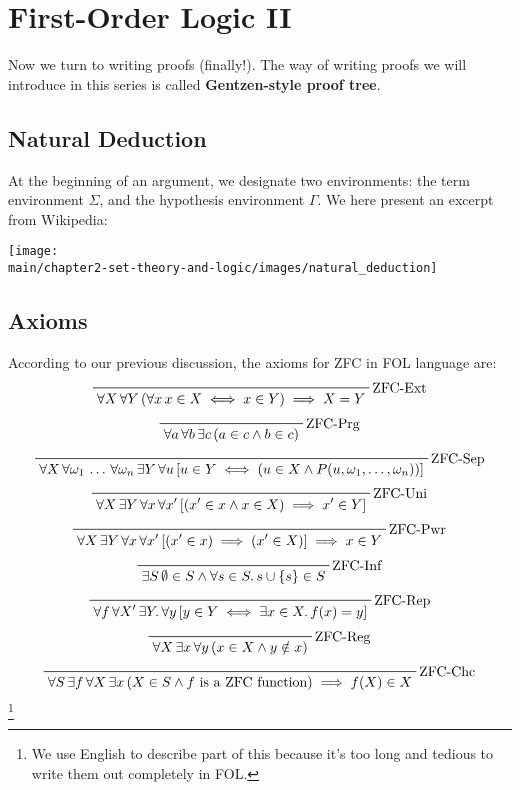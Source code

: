 \documentclass[../main.tex]{subfiles}
\begin{document}
\section{First-Order Logic II}
Now we turn to writing proofs (finally!). The way of writing proofs we will introduce in this series is called \textbf{Gentzen-style proof tree}.


\subsection{Natural Deduction}\label{sub:natural_deduction}
At the beginning of an argument, we designate two environments: the term environment $\Sigma$, and the hypothesis environment $\Gamma$. We here present an excerpt from Wikipedia:
\begin{center}
\texttt{[image: \\main/chapter2-set-theory-and-logic/images/natural\_deduction]}
\end{center}

\subsection{Axioms}
According to our previous discussion, the axioms for ZFC in FOL language are:
$$\prfbyaxiom{ZFC-Ext}{\forall X\,\forall Y\,(\forall x\,x\in X\iff x\in Y)\implies X=Y}$$
$$\prfbyaxiom{ZFC-Prg}{\forall a\,\forall b\,\exists c\,(a\in c\land b\in c)}$$
$$\prfbyaxiom{ZFC-Sep}{\forall X\,\forall \omega_1\,\dots\,\forall \omega_n\,\exists Y\,\forall u\,[u\in Y\iff(u\in X\land P(u,\omega_1,\dots,\omega_n))]}$$
$$\prfbyaxiom{ZFC-Uni}{\forall X\,\exists Y\,\forall x\,\forall x'\,[(x'\in x\land x\in X)\implies x'\in Y]}$$
$$\prfbyaxiom{ZFC-Pwr}{\forall X\,\exists Y\,\forall x\,\forall x'\,[(x'\in x)\implies(x'\in X)]\implies x\in Y}$$
$$\prfbyaxiom{ZFC-Inf}{\exists S\,\emptyset\in S\land\forall s\in S.\,s\cup\{s\}\in S}$$
$$\prfbyaxiom{ZFC-Rep}{\forall f\,\forall X'\,\exists Y.\,\forall y\,[y\in Y\iff\exists x\in X.\,f(x)=y]}$$
$$\prfbyaxiom{ZFC-Reg}{\forall X\,\exists x\,\forall y\,(x\in X\land y\notin x)}$$
$$\prfbyaxiom{ZFC-Chc}{\forall S\,\exists f\,\forall X\,\exists x\,(X\in S\land f\text{ is a ZFC function})\implies f(X)\in X}$$\footnote{We use English to describe part of this because it's too long and tedious to write them out completely in FOL.}
\end{document}
